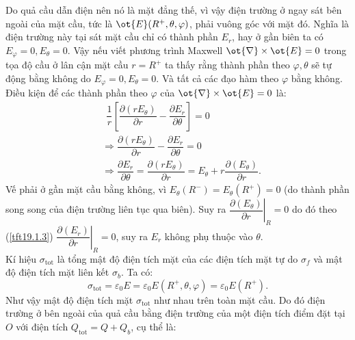 \begin{loigiai}
\begin{enumerate}[1)]
\begin{enumerate}[a)]
\begin{center}
\begin{tikzpicture}[x=0.75pt,y=0.75pt,yscale=-1,xscale=1]
            
            \end{tikzpicture}
        \end{center}
        Do quả cầu dẫn điện nên nó là mặt đẳng thế, vì vậy điện trường ở ngay sát bên ngoài của mặt cầu, tức là $\ot{E}({{R}^{+}},\theta ,\varphi )$, phải vuông góc với mặt đó. Nghĩa là điện trường này tại sát mặt cầu chỉ có thành phần ${{E}_{r}}$, hay ở gần biên ta có ${{E}_{\varphi }}=0,{{E}_{\theta }}=0$. Vậy nếu viết phương trình Maxwell $\ot{\nabla }\times \ot{E}=0$ trong tọa độ cầu ở lân cận mặt cầu $r={{R}^{+}}$ ta thấy rằng thành phần theo $\varphi ,\theta $ sẽ tự động bằng không do ${{E}_{\varphi }}=0,{{E}_{\theta }}=0$. Và tất cả các đạo hàm theo $\varphi $ bằng không. Điều kiện để các thành phần theo $\varphi $ của $\ot{\nabla }\times \ot{E}=0$ là:
        \[\begin{aligned}
            &~~\dfrac{1}{r}\left[ \dfrac{\partial \left( r{{E}_{\theta }} \right)}{\partial r}-\dfrac{\partial {{E}_{r}}}{\partial \theta } \right]=0\\
            &\Rightarrow \dfrac{\partial \left( r{{E}_{\theta }} \right)}{\partial r}-\dfrac{\partial {{E}_{r}}}{\partial \theta }=0\\
            &\Rightarrow \dfrac{\partial {{E}_{r}}}{\partial \theta }=\dfrac{\partial \left( r{{E}_{\theta }} \right)}{\partial r}={{E}_{\theta }}+r\dfrac{\partial \left( {{E}_{\theta }} \right)}{\partial r}.
        \end{aligned}
        \]
        Vế phải ở gần mặt cầu bằng không, vì ${{E}_{\theta }}\left( {{R}^{-}} \right)={{E}_{\theta }}\left( {{R}^{+}} \right)=0$ (do thành phần song song của điện trường liên tục qua biên). Suy ra ${{\left. \dfrac{\partial \left( {{E}_{\theta }} \right)}{\partial r} \right|}_{R}}=0$ do đó theo (\ref{tft19.1.3}) ${{\left. \dfrac{\partial \left( {{E}_{r}} \right)}{\partial r} \right|}_{R}}=0$, suy ra ${{E}_{r}}$ không phụ thuộc vào $\theta $.
        \\Kí hiệu ${{\sigma }_{\text{tot}}}$ là tổng mật độ điện tích mặt của các điện tích mặt tự do ${{\sigma }_{f}}$ và mật độ điện tích mặt liên kết ${{\sigma }_{b}}$. Ta có:
        \[{{\sigma}_{\text{tot}}}={{\varepsilon }_{0}}E={{\varepsilon }_{0}}E\left( {{R}^{+}},\theta ,\varphi  \right)={{\varepsilon }_{0}}E\left( {{R}^{+}} \right).\]
        Như vậy mật độ điện tích mặt ${{\sigma }_{\text{tot}}}$ như nhau trên toàn mặt cầu. Do đó điện trường ở bên ngoài của quả cầu bằng điện trường của một điện tích điểm đặt tại $O$ với điện tích ${{Q}_{\text{tot}}}=Q+{{Q}_{b}}$, cụ thể là:

\end{enumerate}
\end{enumerate}
\end{loigiai}

